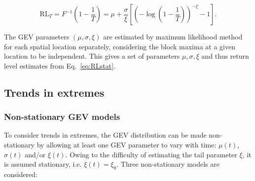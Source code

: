 \documentclass[hess, manuscript]{copernicus}
\begin{document}
\begin{equation}\label{eq:RLstat}
\mathrm{RL}_{T}
= F^{-1}\!\left(1 - \frac{1}{T}\right)
= \mu + \frac{\sigma}{\xi}
\left[
\left(
-\log\!\left(1 - \frac{1}{T}\right)
\right)^{-\xi}
- 1
\right].
\end{equation}


The GEV parameters $(\mu,\sigma,\xi)$ are estimated by maximum likelihood method for each
spatial location separately, considering the block maxima at a given
location to be independent. This gives a set of parameters $\mu,\sigma,\xi$ and thus
return level estimates from Eq.~\ref{eq:RLstat}.

\subsection{Trends in extremes}\label{trends-in-extremes}

\subsubsection{Non-stationary GEV models}\label{non-stationary-gev}

To consider trends in extremes, the GEV distribution can be made non-stationary
by allowing at least one GEV parameter to vary with time: $\mu(t)$, $\sigma(t)$
and/or $\xi(t)$. Owing to the difficulty of estimating the tail parameter $\xi$,
it is assumed stationary, i.e. $\xi(t) = \xi_0$. Three non-stationary models are
considered:
\end{document}
